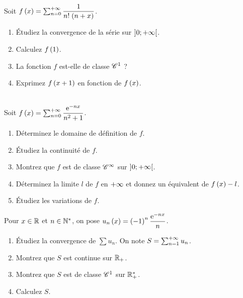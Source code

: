 \begin{exo}~\\
Soit \(f\left(x\right)=\sum_{n=0}^{+\infty}\dfrac{1}{n!\;\!\left(n+x\right)}\).

\begin{enumerate}
    \item Étudiez la convergence de la série sur \(\left]0;+\infty\right[\). \\
    \item Calculez \(f\left(1\right)\). \\
    \item La fonction \(f\) est-elle de classe \(\mathscr{C}^{1}\) ? \\
    \item Exprimez \(f\left(x+1\right)\) en fonction de \(f\left(x\right)\).
\end{enumerate}
\end{exo}

\begin{exo}~\\
Soit \(f\left(x\right)=\sum_{n=0}^{+\infty}\dfrac{\mathrm{e}^{-nx}}{n^2+1}\).

\begin{enumerate}
    \item Déterminez le domaine de définition de \(f\). \\
    \item Étudiez la continuité de \(f\). \\
    \item Montrez que \(f\) est de classe \(\mathscr{C}^{\infty}\) sur \(\left]0;+\infty\right[\). \\
    \item Déterminez la limite \(l\) de \(f\) en \(+\infty\) et donnez un équivalent de \(f\left(x\right)-l\). \\
    \item Étudiez les variations de \(f\).
\end{enumerate}
\end{exo}

\begin{exo}
Pour \(x\in\mathbb{R}\) et \(n\in\mathbb{N}^*\), on pose \(u_n\left(x\right)=\left(-1\right)^n\dfrac{\mathrm{e}^{-nx}}{n}\).

\begin{enumerate}
    \item Étudiez la convergence de \(\sum u_n\). On note \(S=\sum_{n=1}^{+\infty}u_n\). \\
    \item Montrez que \(S\) est continue sur \(\mathbb{R}_+\). \\
    \item Montrez que \(S\) est de classe \(\mathscr{C}^{1}\) sur \(\mathbb{R}_+^*\). \\
    \item Calculez \(S\).
\end{enumerate}
\end{exo}

